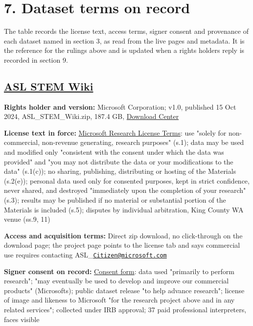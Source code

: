 \documentclass[10pt,a4paper]{article}
\begin{document}
\section{7. Dataset terms on record}\label{7-dataset-terms-on-record}

The table records the license text, access terms, signer consent and
provenance of each dataset named in section 3, as read from the live
pages and metadata. It is the reference for the rulings above and is
updated when a rights holder\textquotesingle s reply is recorded in
section 9.

\subsection{\texorpdfstring{\href{https://www.microsoft.com/en-us/research/project/asl-stem-wiki/}{ASL
STEM Wiki}}{ASL STEM Wiki}}\label{asl-stem-wiki}

\textbf{Rights holder and version:} Microsoft Corporation; v1.0,
published 15 Oct 2024, ASL\_STEM\_Wiki.zip, 187.4 GB,
\href{https://www.microsoft.com/en-us/download/details.aspx?id=106253}{Download
Center}

\textbf{License text in force:}
\href{https://www.microsoft.com/en-us/research/project/asl-stem-wiki/dataset-license/}{Microsoft
Research License Terms}: use "solely for non-commercial, non-revenue
generating, research purposes" (s.1); data may be used and modified only
"consistent with the consent under which the data was provided" and "you
may not distribute the data or your modifications to the data" (s.1(c));
no sharing, publishing, distributing or hosting of the Materials
(s.2(e)); personal data used only for consented purposes, kept in strict
confidence, never shared, and destroyed "immediately upon the completion
of your research" (s.3); results may be published if no material or
substantial portion of the Materials is included (s.5); disputes by
individual arbitration, King County WA venue (ss.9, 11)

\textbf{Access and acquisition terms:} Direct zip download, no
click-through on the download page; the project page points to the
license tab and says commercial use requires contacting
ASL\_\href{mailto:Citizen@microsoft.com}{\nolinkurl{Citizen@microsoft.com}}

\textbf{Signer consent on record:}
\href{https://www.microsoft.com/en-us/research/project/asl-stem-wiki/consent-form/}{Consent
form}: data used "primarily to perform research"; "may eventually be
used to develop and improve our commercial products"
(Microsoft\textquotesingle s); public dataset release "to help advance
research"; license of image and likeness to Microsoft "for the research
project above and in any related services"; collected under IRB
approval; 37 paid professional interpreters, faces visible
\end{document}
